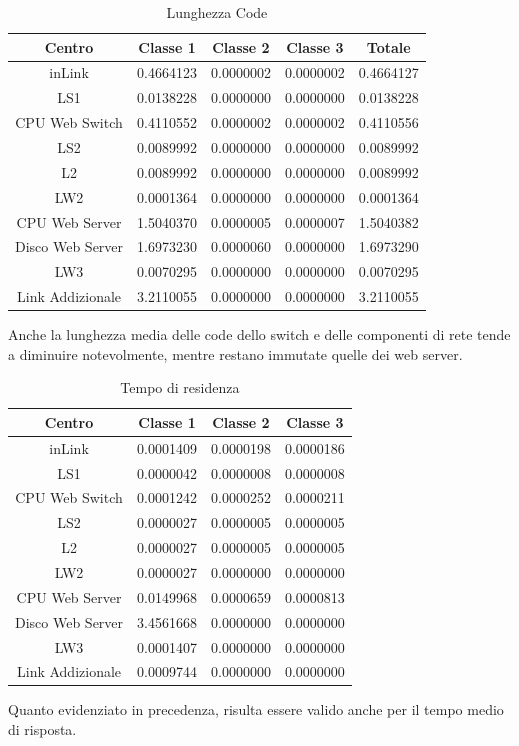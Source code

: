 \begin{table}[htbp]
\begin{center}
\begin{tabular}{|c|c|c|c|c|}
\hline
Centro	&Classe 1	&Classe 2	&Classe 3	&Totale\\
\hline
\hline
inLink & 0.4664123 & 0.0000002 & 0.0000002 & 0.4664127 \\ \hline
LS1 & 0.0138228 & 0.0000000 & 0.0000000 & 0.0138228 \\ \hline
CPU Web Switch & 0.4110552 & 0.0000002 & 0.0000002 & 0.4110556 \\ \hline
LS2 & 0.0089992 & 0.0000000 & 0.0000000 & 0.0089992 \\ \hline
L2 & 0.0089992 & 0.0000000 & 0.0000000 & 0.0089992 \\ \hline
LW2 & 0.0001364 & 0.0000000 & 0.0000000 & 0.0001364 \\ \hline
CPU Web Server & 1.5040370 & 0.0000005 & 0.0000007 & 1.5040382 \\ \hline
Disco Web Server & 1.6973230 & 0.0000060 & 0.0000000 & 1.6973290 \\ \hline
LW3 & 0.0070295 & 0.0000000 & 0.0000000 & 0.0070295 \\ \hline
Link Addizionale & 3.2110055 & 0.0000000 & 0.0000000 & 3.2110055 \\ \hline
\end{tabular}
\end{center}
\caption{Lunghezza Code}
\label{lunghezzacode}
\end{table}
Anche la lunghezza media delle code dello switch e delle componenti di rete tende a diminuire notevolmente, mentre restano immutate quelle dei web server.
\begin{table}[htbp]
\begin{center}
\begin{tabular}{|c|c|c|c|}
\hline
Centro	&Classe 1	&Classe 2	&Classe 3\\
\hline
\hline
inLink & 0.0001409 & 0.0000198 & 0.0000186 \\ \hline
LS1 & 0.0000042 & 0.0000008 & 0.0000008 \\ \hline
CPU Web Switch & 0.0001242 & 0.0000252 & 0.0000211 \\ \hline
LS2 & 0.0000027 & 0.0000005 & 0.0000005 \\ \hline
L2 & 0.0000027 & 0.0000005 & 0.0000005 \\ \hline
LW2 & 0.0000027 & 0.0000000 & 0.0000000 \\ \hline
CPU Web Server & 0.0149968 & 0.0000659 & 0.0000813 \\ \hline
Disco Web Server & 3.4561668 & 0.0000000 & 0.0000000 \\ \hline
LW3 & 0.0001407 & 0.0000000 & 0.0000000 \\ \hline
Link Addizionale & 0.0009744 & 0.0000000 & 0.0000000 \\ \hline
\end{tabular}
\end{center}
\caption{Tempo di residenza}
\label{tempodiresidenza}
\end{table}
Quanto evidenziato in precedenza, risulta essere valido anche per il tempo medio di risposta.

